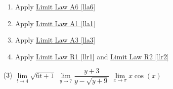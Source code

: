\documentclass[12pt,]{book}
\theoremstyle{plain}
\theoremstyle{definition}
\numberwithin{equation}{section}
\begin{document}
\begin{multicols}{2}
\begin{enumerate}[label=(\alph*)]
\item{}Apply \hyperref[lla6]{Limit Law A6 \ref{lla6}}%
\item{}Apply \hyperref[lla1]{Limit Law A1 \ref{lla1}}%
\item{}Apply \hyperref[lla3]{Limit Law A3 \ref{lla3}}%
\item{}Apply \hyperref[llr1]{Limit Law R1 \ref{llr1}} and \hyperref[llr2]{Limit Law R2 \ref{llr2}}%
\end{enumerate}
\end{multicols}
\par
\begin{exercisegroup}(3)
\exercise[4.]\hypertarget{exercise-first-apply-limit-laws}{\null}\(\lim\limits_{t\to4}\sqrt{6t+1}\)%
\exercise[5.]\hypertarget{exercise-70}{\null}\(\lim\limits_{y\to7}\dfrac{y+3}{y-\sqrt{y+9}}\)%
\exercise[6.]\hypertarget{exercise-71}{\null}\(\lim\limits_{x\to\pi}x\cos(x)\)%
\end{exercisegroup}
\par\smallskip\noindent
\typeout{************************************************}
\typeout{************************************************}
\end{document}
